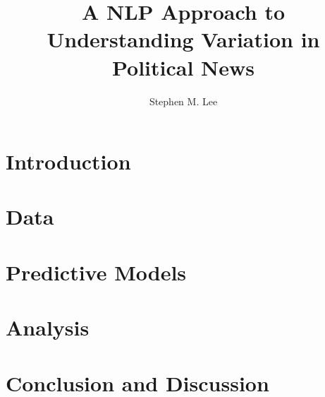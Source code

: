 \documentclass{article}
\author{Stephen M. Lee}
\title{A NLP Approach to Understanding Variation in Political News}
\begin{document}
	\maketitle 
	
	\section{Introduction}
	
	\section{Data}
	
	\section{Predictive Models}
	
	\section{Analysis}
	
	\section{Conclusion and Discussion}
	
\end{document}
